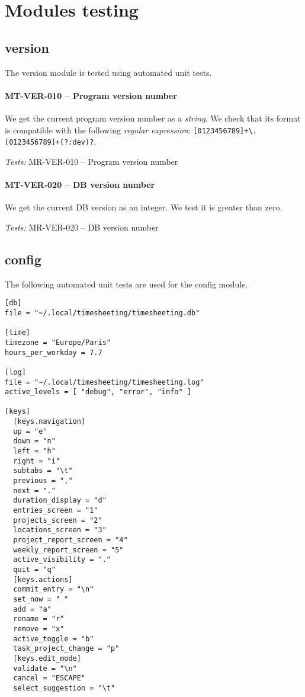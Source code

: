 \section{Modules testing}
\subsection{version}
The version module is tested using automated unit tests.

\paragraph{MT-VER-010 -- Program version number}
We get the current program version number as a \emph{string}.
We check that its format is compatible with the following \emph{regular
  expression}: \lstinline{[0123456789]+\.[0123456789]+(?:dev)?}.

\textit{Tests: } MR-VER-010 -- Program version number

\paragraph{MT-VER-020 -- DB version number}
We get the current DB version as an integer. We test it is greater than zero.

\textit{Tests: } MR-VER-020 -- DB version number

\subsection{config}
The following automated unit tests are used for the config module.

\begin{minipage}{\linewidth}
  \begin{lstlisting}[caption={timesheeting example configuration file},
                     label={lst:config_file}]
[db]
file = "~/.local/timesheeting/timesheeting.db"

[time]
timezone = "Europe/Paris"
hours_per_workday = 7.7

[log]
file = "~/.local/timesheeting/timesheeting.log"
active_levels = [ "debug", "error", "info" ]

[keys]
  [keys.navigation]
  up = "e"
  down = "n"
  left = "h"
  right = "i"
  subtabs = "\t"
  previous = ","
  next = "."
  duration_display = "d"
  entries_screen = "1"
  projects_screen = "2"
  locations_screen = "3"
  project_report_screen = "4"
  weekly_report_screen = "5"
  active_visibility = "."
  quit = "q"
  [keys.actions]
  commit_entry = "\n"
  set_now = " "
  add = "a"
  rename = "r"
  remove = "x"
  active_toggle = "b"
  task_project_change = "p"
  [keys.edit_mode]
  validate = "\n"
  cancel = "ESCAPE"
  select_suggestion = "\t"
\end{lstlisting} \end{minipage}

